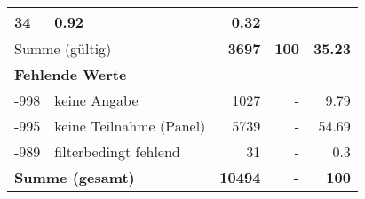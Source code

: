 \begin{longtable}{lXrrr}
       \num{34} &
       \num[round-mode=places,round-precision=2]{0,92} &
         \num[round-mode=places,round-precision=2]{0,32} \\
     \midrule
     \multicolumn{2}{l}{Summe (gültig)} &
       \textbf{\num{3697}} &
     \textbf{100} &
       \textbf{\num[round-mode=places,round-precision=2]{35,23}} \\
     \multicolumn{5}{l}{\textbf{Fehlende Werte}}\\
       -998 &
       keine Angabe &
         \num{1027} &
        - &
         \num[round-mode=places,round-precision=2]{9,79} \\
       -995 &
       keine Teilnahme (Panel) &
         \num{5739} &
        - &
         \num[round-mode=places,round-precision=2]{54,69} \\
       -989 &
       filterbedingt fehlend &
         \num{31} &
        - &
         \num[round-mode=places,round-precision=2]{0,3} \\
     \midrule
     \multicolumn{2}{l}{\textbf{Summe (gesamt)}} &
          \textbf{\num{10494}} &
        \textbf{-} &
        \textbf{100} \\
     \bottomrule
     \end{longtable}
     
